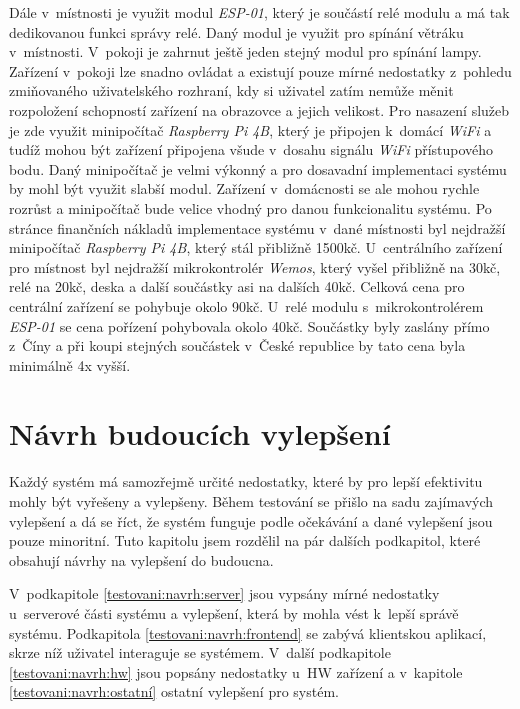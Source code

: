 Dále v~místnosti je využit modul \emph{ESP-01}, který je součástí relé modulu a má tak dedikovanou funkci správy relé.
Daný modul je využit pro spínání větráku v~místnosti.
V~pokoji je zahrnut ještě jeden stejný modul pro spínání lampy.
Zařízení v~pokoji lze snadno ovládat a existují pouze mírné nedostatky z~pohledu zmiňovaného uživatelského rozhraní, kdy si uživatel zatím nemůže měnit rozpoložení schopností zařízení na obrazovce a jejich velikost.
Pro nasazení služeb je zde využit minipočítač \emph{Raspberry Pi 4B}, který je připojen k~domácí \emph{WiFi} a tudíž mohou být zařízení připojena všude v~dosahu signálu \emph{WiFi} přístupového bodu.
Daný minipočítač je velmi výkonný a pro dosavadní implementaci systému by mohl být využit slabší modul.
Zařízení v~domácnosti se ale mohou rychle rozrůst a minipočítač bude velice vhodný pro danou funkcionalitu systému.
\newpage
Po stránce finančních nákladů implementace systému v~dané místnosti byl nejdražší minipočítač \emph{Raspberry Pi 4B}, který stál přibližně 1500kč.
U~centrálního zařízení pro místnost byl nejdražší mikrokontrolér \emph{Wemos}, který vyšel přibližně na 30kč, relé na 20kč, deska a další součástky asi na dalších 40kč.
Celková cena pro centrální zařízení se pohybuje okolo 90kč.
U~relé modulu s~mikrokontrolérem \emph{ESP-01} se cena pořízení pohybovala okolo 40kč.
Součástky byly zaslány přímo z~Číny a při koupi stejných součástek v~České republice by tato cena byla minimálně 4x vyšší.

\section{Návrh budoucích vylepšení}
\label{testovani:budouci}
Každý systém má samozřejmě určité nedostatky, které by pro lepší efektivitu mohly být vyřešeny a vylepšeny.
Během testování se přišlo na sadu zajímavých vylepšení a dá se říct, že systém funguje podle očekávání a dané vylepšení jsou pouze minoritní.
Tuto kapitolu jsem rozdělil na pár dalších podkapitol, které obsahují návrhy na vylepšení do budoucna.

V~podkapitole \ref{testovani:navrh:server} jsou vypsány mírné nedostatky u~serverové části systému a vylepšení, která by mohla vést k~lepší správě systému.
Podkapitola \ref{testovani:navrh:frontend} se zabývá klientskou aplikací, skrze níž uživatel interaguje se systémem.
V~další podkapitole \ref{testovani:navrh:hw} jsou popsány nedostatky u~HW zařízení a v~kapitole \ref{testovani:navrh:ostatní} ostatní vylepšení pro systém.

